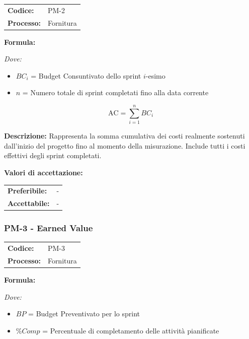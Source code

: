 \documentclass[a4paper,11pt,oneside]{scrartcl}
\begin{document}
\noindent
\begin{tabular}{@{}p{}p{}@{}}
\textbf{Codice:} & PM-2 \\
\textbf{Processo:} & Fornitura \\
\end{tabular}

\vspace{0.3cm}
\noindent\textbf{Formula:}

\noindent\textit{Dove:}
\begin{itemize}[leftmargin=1.5cm, topsep=0pt, itemsep=0pt]
    \item $BC_i$ = Budget Consuntivato dello sprint $i$-esimo
    \item $n$ = Numero totale di sprint completati fino alla data corrente
\end{itemize}

\[
\text{AC} = \sum_{i=1}^{n} BC_i
\]

\noindent\textbf{Descrizione:} Rappresenta la somma cumulativa dei costi realmente sostenuti dall'inizio del progetto fino al momento della misurazione. Include tutti i costi effettivi degli sprint completati.

\vspace{0.2cm}
\noindent\textbf{Valori di accettazione:}
\vspace{0.1cm}

\noindent
\begin{tabular}{@{}ll@{}}
\textbf{Preferibile:} & - \\
\textbf{Accettabile:} & - \\
\end{tabular}

\subsubsection{PM-3 - Earned Value}

\noindent
\begin{tabular}{@{}p{}p{}@{}}
\textbf{Codice:} & PM-3 \\
\textbf{Processo:} & Fornitura \\
\end{tabular}

\vspace{0.3cm}
\noindent\textbf{Formula:}

\noindent\textit{Dove:}
\begin{itemize}[leftmargin=1.5cm, topsep=0pt, itemsep=0pt]
    \item $BP$ = Budget Preventivato per lo sprint
    \item $\%Comp$ = Percentuale di completamento delle attività pianificate
\end{itemize}
\end{document}
